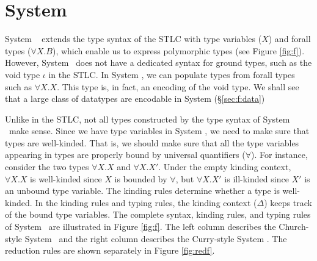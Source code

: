\section{System \F} \label{sec:f}
System \F\ \cite{Gir71} extends the type syntax of the STLC with
type variables ($X$) and forall types ($\forall X.B$), which enable us
to express polymorphic types (see Figure \ref{fig:f}). However,
System \F\ does not have a dedicated syntax for ground types, such as
the void type $\iota$ in the STLC. In System \F, we can populate types
from forall types such as $\forall X.X$. This type is, in fact,
an encoding of the void type. We shall see that a large class of datatypes
are encodable in System \F (\S\ref{sec:f:data})

Unlike in the STLC, not all types constructed by the type syntax of System \F\
make sense. Since we have type variables in System \F, we need to
make sure that types are well-kinded. That is, we should make sure
that all the type variables appearing in types are properly bound by
universal quantifiers ($\forall$). For instance, consider the two types
$\forall X.X$ and $\forall X.X'$. Under the empty kinding context,
$\forall X.X$ is well-kinded since $X$ is bounded by $\forall$, but
$\forall X.X'$ is ill-kinded since $X'$ is an unbound type variable.
The kinding rules determine whether a type is well-kinded.
In the kinding rules and typing rules, the kinding context ($\Delta$)
keeps track of the bound type variables. The complete syntax, kinding rules,
and typing rules of System \F\ are illustrated in Figure \ref{fig:f}.
The left column describes the Church-style System \F\ and the right
column describes the Curry-style System \F. The reduction rules are
shown separately in Figure \ref{fig:redf}.

